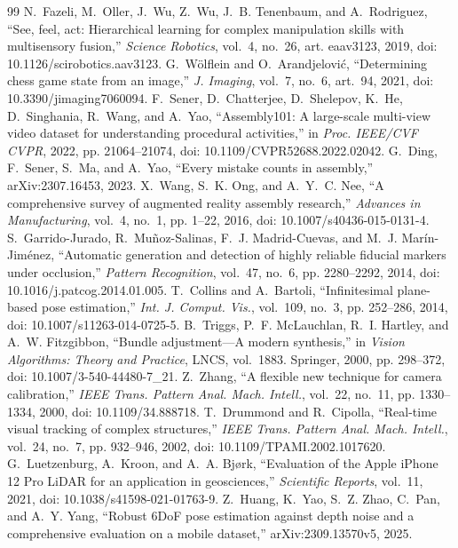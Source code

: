 \documentclass[conference,10pt]{IEEEtran}
\begin{document}
\begin{thebibliography}{99}
 N.~Fazeli, M.~Oller, J.~Wu, Z.~Wu, J.~B. Tenenbaum, and A.~Rodriguez, ``See, feel, act: Hierarchical learning for complex manipulation skills with multisensory fusion,'' \emph{Science Robotics}, vol.~4, no.~26, art. eaav3123, 2019, doi: 10.1126/scirobotics.aav3123.
 G.~W\"olflein and O.~Arandjelovi\'c, ``Determining chess game state from an image,'' \emph{J. Imaging}, vol.~7, no.~6, art.~94, 2021, doi: 10.3390/jimaging7060094.
 F.~Sener, D.~Chatterjee, D.~Shelepov, K.~He, D.~Singhania, R.~Wang, and A.~Yao, ``Assembly101: A large-scale multi-view video dataset for understanding procedural activities,'' in \emph{Proc. IEEE/CVF CVPR}, 2022, pp. 21064--21074, doi: 10.1109/CVPR52688.2022.02042.
 G.~Ding, F.~Sener, S.~Ma, and A.~Yao, ``Every mistake counts in assembly,'' arXiv:2307.16453, 2023.
 X.~Wang, S.~K. Ong, and A.~Y.~C. Nee, ``A comprehensive survey of augmented reality assembly research,'' \emph{Advances in Manufacturing}, vol.~4, no.~1, pp. 1--22, 2016, doi: 10.1007/s40436-015-0131-4.
 S.~Garrido-Jurado, R.~Mu\~noz-Salinas, F.~J. Madrid-Cuevas, and M.~J. Mar\'in-Jim\'enez, ``Automatic generation and detection of highly reliable fiducial markers under occlusion,'' \emph{Pattern Recognition}, vol.~47, no.~6, pp. 2280--2292, 2014, doi: 10.1016/j.patcog.2014.01.005.
 T.~Collins and A.~Bartoli, ``Infinitesimal plane-based pose estimation,'' \emph{Int. J. Comput. Vis.}, vol.~109, no.~3, pp. 252--286, 2014, doi: 10.1007/s11263-014-0725-5.
 B.~Triggs, P.~F. McLauchlan, R.~I. Hartley, and A.~W. Fitzgibbon, ``Bundle adjustment---A modern synthesis,'' in \emph{Vision Algorithms: Theory and Practice}, LNCS, vol.~1883. Springer, 2000, pp. 298--372, doi: 10.1007/3-540-44480-7\_21.
 Z.~Zhang, ``A flexible new technique for camera calibration,'' \emph{IEEE Trans. Pattern Anal. Mach. Intell.}, vol.~22, no.~11, pp. 1330--1334, 2000, doi: 10.1109/34.888718.
 T.~Drummond and R.~Cipolla, ``Real-time visual tracking of complex structures,'' \emph{IEEE Trans. Pattern Anal. Mach. Intell.}, vol.~24, no.~7, pp. 932--946, 2002, doi: 10.1109/TPAMI.2002.1017620.
 G.~Luetzenburg, A.~Kroon, and A.~A. Bj{\o}rk, ``Evaluation of the Apple iPhone 12 Pro LiDAR for an application in geosciences,'' \emph{Scientific Reports}, vol.~11, 2021, doi: 10.1038/s41598-021-01763-9.
 Z.~Huang, K.~Yao, S.~Z. Zhao, C.~Pan, and A.~Y. Yang, ``Robust 6DoF pose estimation against depth noise and a comprehensive evaluation on a mobile dataset,'' arXiv:2309.13570v5, 2025.

\end{thebibliography}
\end{document}

